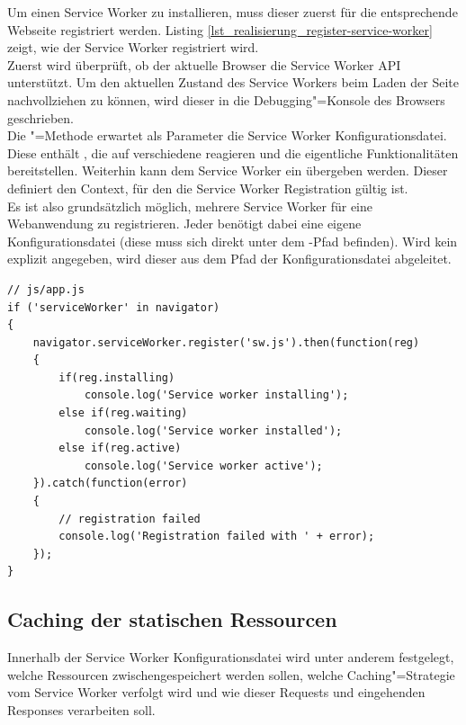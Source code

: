 Um einen Service Worker zu installieren, muss dieser zuerst für die entsprechende Webseite registriert werden. Listing \ref{lst_realisierung_register-service-worker} zeigt, wie der Service Worker registriert wird.\\
Zuerst wird überprüft, ob der aktuelle Browser die Service Worker API unterstützt. Um den aktuellen Zustand des Service Workers beim Laden der Seite nachvollziehen zu können, wird dieser in die Debugging"=Konsole des Browsers geschrieben.\\
Die "=Methode erwartet als Parameter die Service Worker Konfigurationsdatei. Diese enthält , die auf verschiedene  reagieren und die eigentliche Funktionalitäten bereitstellen. Weiterhin kann dem Service Worker ein  übergeben werden. Dieser definiert den Context, für den die Service Worker Registration gültig ist. \\
Es ist also grundsätzlich möglich, mehrere Service Worker für eine Webanwendung zu registrieren. Jeder  benötigt dabei eine eigene Konfigurationsdatei (diese muss sich direkt unter dem -Pfad befinden). Wird kein  explizit angegeben, wird dieser aus dem Pfad der Konfigurationsdatei abgeleitet. \\

\begin{lstlisting}[caption={Einrichtung Service Worker},label={lst_realisierung_register-service-worker}, frame=single]
// js/app.js
if ('serviceWorker' in navigator)
{
    navigator.serviceWorker.register('sw.js').then(function(reg) 
    {
        if(reg.installing)
            console.log('Service worker installing');
        else if(reg.waiting)
            console.log('Service worker installed');
        else if(reg.active)
            console.log('Service worker active');
    }).catch(function(error)
    {
        // registration failed
        console.log('Registration failed with ' + error);
    });
}
\end{lstlisting}

\subsection{Caching der statischen Ressourcen}

Innerhalb der Service Worker Konfigurationsdatei wird unter anderem festgelegt, welche Ressourcen zwischengespeichert werden sollen, welche Caching"=Strategie vom Service Worker verfolgt wird und wie dieser Requests und eingehenden Responses verarbeiten soll. 

